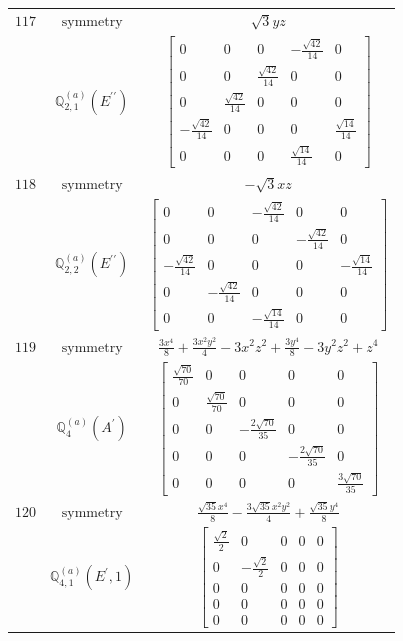 \documentclass[fleqn,8pt,landscape]{jsarticle}
\begin{document}
\begin{longtable}{ccc}
$ 117 $ & $ \text{symmetry} $ & $ \sqrt{3} y z $ \\
$  $ & $ \mathbb{Q}_{2,1}^{(a)}(E^{\prime\prime}) $ & $ \begin{bmatrix} 0 & 0 & 0 & - \frac{\sqrt{42}}{14} & 0 \\ 0 & 0 & \frac{\sqrt{42}}{14} & 0 & 0 \\ 0 & \frac{\sqrt{42}}{14} & 0 & 0 & 0 \\ - \frac{\sqrt{42}}{14} & 0 & 0 & 0 & \frac{\sqrt{14}}{14} \\ 0 & 0 & 0 & \frac{\sqrt{14}}{14} & 0 \end{bmatrix} $ \\ \hline
$ 118 $ & $ \text{symmetry} $ & $ - \sqrt{3} x z $ \\
$  $ & $ \mathbb{Q}_{2,2}^{(a)}(E^{\prime\prime}) $ & $ \begin{bmatrix} 0 & 0 & - \frac{\sqrt{42}}{14} & 0 & 0 \\ 0 & 0 & 0 & - \frac{\sqrt{42}}{14} & 0 \\ - \frac{\sqrt{42}}{14} & 0 & 0 & 0 & - \frac{\sqrt{14}}{14} \\ 0 & - \frac{\sqrt{42}}{14} & 0 & 0 & 0 \\ 0 & 0 & - \frac{\sqrt{14}}{14} & 0 & 0 \end{bmatrix} $ \\ \hline
$ 119 $ & $ \text{symmetry} $ & $ \frac{3 x^{4}}{8} + \frac{3 x^{2} y^{2}}{4} - 3 x^{2} z^{2} + \frac{3 y^{4}}{8} - 3 y^{2} z^{2} + z^{4} $ \\
$  $ & $ \mathbb{Q}_{4}^{(a)}(A^{\prime}) $ & $ \begin{bmatrix} \frac{\sqrt{70}}{70} & 0 & 0 & 0 & 0 \\ 0 & \frac{\sqrt{70}}{70} & 0 & 0 & 0 \\ 0 & 0 & - \frac{2 \sqrt{70}}{35} & 0 & 0 \\ 0 & 0 & 0 & - \frac{2 \sqrt{70}}{35} & 0 \\ 0 & 0 & 0 & 0 & \frac{3 \sqrt{70}}{35} \end{bmatrix} $ \\ \hline
$ 120 $ & $ \text{symmetry} $ & $ \frac{\sqrt{35} x^{4}}{8} - \frac{3 \sqrt{35} x^{2} y^{2}}{4} + \frac{\sqrt{35} y^{4}}{8} $ \\
$  $ & $ \mathbb{Q}_{4,1}^{(a)}(E^{\prime},1) $ & $ \begin{bmatrix} \frac{\sqrt{2}}{2} & 0 & 0 & 0 & 0 \\ 0 & - \frac{\sqrt{2}}{2} & 0 & 0 & 0 \\ 0 & 0 & 0 & 0 & 0 \\ 0 & 0 & 0 & 0 & 0 \\ 0 & 0 & 0 & 0 & 0 \end{bmatrix} $ \\ \hline

\end{longtable}
\end{document}
